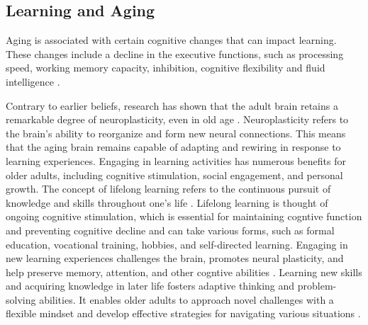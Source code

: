 \subsection{Learning and Aging}

Aging is associated with certain cognitive changes that can impact learning. These changes include a decline in the executive functions, such as processing speed, working memory capacity, inhibition, cognitive flexibility and fluid intelligence \cite{Grady2012, Reuter-Lorenz2010}. 


Contrary to earlier beliefs, research has shown that the adult brain retains a remarkable degree of neuroplasticity, even in old age \cite{Altenmuller2020}. Neuroplasticity refers to the brain's ability to reorganize and form new neural connections. This means that the aging brain remains capable of adapting and rewiring in response to learning experiences. Engaging in learning activities has numerous benefits for older adults, including cognitive stimulation, social engagement, and personal growth. 
The concept of lifelong learning refers to the continuous pursuit of knowledge and skills throughout one's life \cite{Leipold2012}. Lifelong learning is thought of ongoing cognitive stimulation, which is essential for maintaining cogntive function and preventing cognitive decline and can take various forms, such as formal education, vocational training, hobbies, and self-directed learning. Engaging in new learning experiences challenges the brain, promotes neural plasticity, and help preserve memory, attention, and other cogntive abilities \cite{?}. Learning new skills and acquiring knowledge in later life fosters adaptive thinking and problem-solving abilities. It enables older adults to approach novel challenges with a flexible mindset and develop effective strategies for navigating various situations \cite{?}. 





